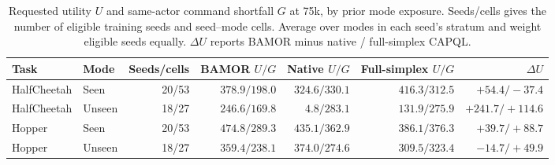 \begin{table}[!htbp]
\centering\footnotesize\setlength{\tabcolsep}{4pt}
\caption{Requested utility $U$ and same-actor command shortfall $G$ at 75k, by prior mode exposure. Seeds/cells gives the number of eligible training seeds and seed--mode cells. Average over modes in each seed's stratum and weight eligible seeds equally. $\Delta U$ reports BAMOR minus native / full-simplex CAPQL.}
\label{tab:grid_seen}
\begin{tabular}{@{}llrrrrr@{}}
\toprule
Task & Mode & Seeds/cells & BAMOR $U/G$ & Native $U/G$ & Full-simplex $U/G$ & $\Delta U$ \\
\midrule
HalfCheetah & Seen & 20/53 & $378.9/198.0$ & $324.6/330.1$ & $416.3/312.5$ & $+54.4/-37.4$ \\
HalfCheetah & Unseen & 18/27 & $246.6/169.8$ & $4.8/283.1$ & $131.9/275.9$ & $+241.7/+114.6$ \\
Hopper & Seen & 20/53 & $474.8/289.3$ & $435.1/362.9$ & $386.1/376.3$ & $+39.7/+88.7$ \\
Hopper & Unseen & 18/27 & $359.4/238.1$ & $374.0/274.6$ & $309.5/323.4$ & $-14.7/+49.9$ \\
\bottomrule
\end{tabular}
\end{table}
